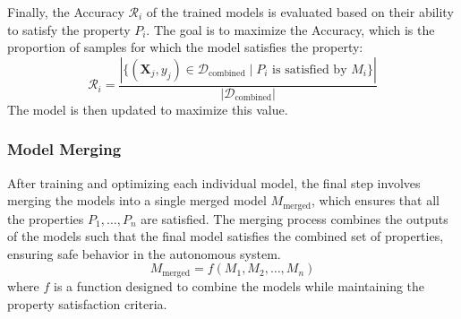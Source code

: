 Finally, the Accuracy \( \mathcal{R}_i \) of the trained models is evaluated based on their ability to satisfy the property \( P_i \). The goal is to maximize the Accuracy, which is the proportion of samples for which the model satisfies the property:
\[
\mathcal{R}_i = \frac{|\{(\mathbf{X}_j, y_j) \in \mathcal{D}_{\text{combined}} \mid P_i \text{ is satisfied by } M_i\}|}{|\mathcal{D}_{\text{combined}}|}
\]
The model is then updated to maximize this value.

\subsubsection{Model Merging}
After training and optimizing each individual model, the final step involves merging the models into a single merged model \( M_{\text{merged}} \), which ensures that all the properties \( P_1, \dots, P_n \) are satisfied. The merging process combines the outputs of the models such that the final model satisfies the combined set of properties, ensuring safe behavior in the autonomous system.
\[
M_{\text{merged}} = f(M_1, M_2, \dots, M_n)
\]
where \( f \) is a function designed to combine the models while maintaining the property satisfaction criteria.






